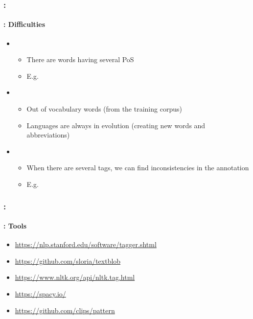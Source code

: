 \documentclass[xcolor=table]{beamer}
\begin{document}
\begin{frame}
	\frametitle{\insertshortsubtitle: \insertsection}
	\framesubtitle{\insertsubsection: Difficulties}

	\begin{itemize}
		\item {}
		\begin{itemize}
			\item There are words having several PoS
			\item E.g. 
		\end{itemize}
		\item {}
		\begin{itemize}
			\item Out of vocabulary words (from the training corpus)
			\item Languages are always in evolution (creating new words and abbreviations)
		\end{itemize}
		\item {}
		\begin{itemize}
			\item When there are several tags, we can find inconsistencies in the annotation
			\item E.g. 
		\end{itemize}
	\end{itemize}

\end{frame}

\begin{frame}
	\frametitle{\insertshortsubtitle: \insertsection}
	\framesubtitle{\insertsubsection: Tools}

	\begin{itemize}
		\item \url{https://nlp.stanford.edu/software/tagger.shtml}
		\item \url{https://github.com/sloria/textblob}
		\item \url{https://www.nltk.org/api/nltk.tag.html}
		\item \url{https://spacy.io/}
		\item \url{https://github.com/clips/pattern}
	\end{itemize}

\end{frame}
\end{document}
